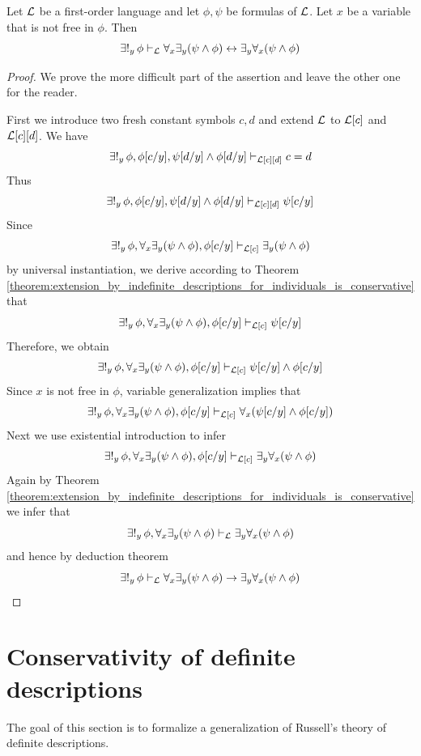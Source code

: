 \documentclass[10pt]{amsart}
\begin{document}
\begin{proposition}\label{proposition:interplay_between_general_and_existential_quantifier_under_unique_existential_quantifer}
	Let ${\mathcal L}$ be a first-order language and let $\phi, \psi$ be formulas of ${\mathcal L}$. Let $x$ be a variable that is not free in $\phi$. Then
  $$\exists!_y\,\phi \vdash_{{\mathcal L}} \forall_x\exists_y(\psi \wedge \phi) \leftrightarrow \exists_y\forall_x(\psi \wedge \phi)$$
\end{proposition}
\begin{proof}
  We prove the more difficult part of the assertion and leave the other one for the reader.

  First we introduce two fresh constant symbols $c,d$ and extend ${\mathcal L}$ to ${\mathcal L}[c]$ and ${\mathcal L}[c][d]$. We have
  $$\exists!_y\,\phi, \phi[c/y], \psi[d/y] \wedge \phi[d/y] \vdash_{{\mathcal L}[c][d]} c = d$$
  Thus
  $$\exists!_y\,\phi, \phi[c/y], \psi[d/y] \wedge \phi[d/y] \vdash_{{\mathcal L}[c][d]} \psi[c/y]$$
  Since 
  $$\exists!_y\,\phi, \forall_x\exists_y(\psi \wedge \phi), \phi[c/y] \vdash_{{\mathcal L}[c]} \exists_y(\psi \wedge \phi)$$
  by universal instantiation, we derive according to Theorem \ref{theorem:extension_by_indefinite_descriptions_for_individuals_is_conservative} that
  $$\exists!_y\,\phi, \forall_x\exists_y(\psi \wedge \phi), \phi[c/y] \vdash_{{\mathcal L}[c]} \psi[c/y]$$
  Therefore, we obtain
  $$\exists!_y\,\phi, \forall_x\exists_y(\psi \wedge \phi), \phi[c/y] \vdash_{{\mathcal L}[c]} \psi[c/y] \wedge \phi[c/y]$$
  Since $x$ is not free in $\phi$, variable generalization implies that
  $$\exists!_y\,\phi, \forall_x\exists_y(\psi \wedge \phi), \phi[c/y] \vdash_{{\mathcal L}[c]} \forall_x(\psi[c/y] \wedge \phi[c/y])$$
  Next we use existential introduction to infer
  $$\exists!_y\,\phi, \forall_x\exists_y(\psi \wedge \phi), \phi[c/y] \vdash_{{\mathcal L}[c]} \exists_y\forall_x(\psi \wedge \phi)$$
  Again by Theorem \ref{theorem:extension_by_indefinite_descriptions_for_individuals_is_conservative} we infer that
  $$\exists!_y\,\phi, \forall_x\exists_y(\psi \wedge \phi) \vdash_{{\mathcal L}} \exists_y\forall_x(\psi \wedge \phi)$$
  and hence by deduction theorem
  $$\exists!_y\,\phi \vdash_{{\mathcal L}} \forall_x\exists_y(\psi \wedge \phi) \rightarrow \exists_y\forall_x(\psi \wedge \phi)$$
\end{proof}

\section{Conservativity of definite descriptions}
\noindent
The goal of this section is to formalize a generalization of Russell's theory of definite descriptions.
\end{document}
